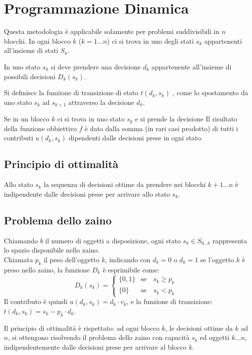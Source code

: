 \documentclass[../template]{subfiles}
\begin{document}
\section{Programmazione Dinamica}
Questa metodologia è applicabile solamente per problemi suddivisibili in $n$ blocchi. In ogni blocco $k$ ($k =1 \dots n$) ci si trova in uno degli stati $s_k$ appartenenti all'insieme di stati $S_k$.

In uno stato $s_k$ si deve prendere una decisione $d_k$ appartenente all'insieme di possibili decisioni $D_k(s_k)$.

Si definisce la funzione di transizione di stato $t(d_k, s_k)$ , come lo spostamento da uno stato $s_k$ ad $s_{k+1}$ attraverso la decisione $d_k$.

Se in un blocco $k$ ci si trova in uno stato $s_k$ e si prende la decisione
Il risultato della funzione obbiettivo $f$ è dato dalla somma (in rari casi prodotto) di tutti i contributi $u(d_k, s_k)$ dipendenti dalle decisioni prese in ogni stato.
\subsection{Principio di ottimalità}
Allo stato $s_k$ la sequenza di decisioni ottime da prendere nei blocchi $k+1 \dots n$ è indipendente dalle decisioni prese per arrivare allo stato $s_k$.

\subsection{Problema dello zaino}
Chiamando $b$ il numero di oggetti a disposizione, ogni stato $s_k \in S_{0\dots b}$ rappresenta lo spazio disponibile nello zaino.
\\
Chiamata $p_k$ il peso dell'oggetto $k$, indicando con $d_k=0$ o $d_k=1$ se l'oggetto $k$ è preso nello zaino, la funzione $D_k$ è esprimibile come:
\[
    D_k(s_k) =
    \begin{cases}
        \{0, 1\}  &\text{se} \quad s_k \ge p_k\\
        \{0\}     &\text{se} \quad s_k < p_k
    \end{cases}
\]
Il contributo è quindi $u(d_k, s_k) = d_k \cdot v_k$, e la funzione di transizione: $t(d_k, s_k) = s_k - p_k\cdot d_k$.

Il principio di ottimalità è rispettato: ad ogni blocco $k$, le decisioni ottime da $k$ ad $n$, si ottengono risolvendo il problema dello zaino con capacità $s_k$ ed oggetti $k\dots n$, indipendentemente dalle decisioni prese per arrivare al blocco $k$.
\end{document}
